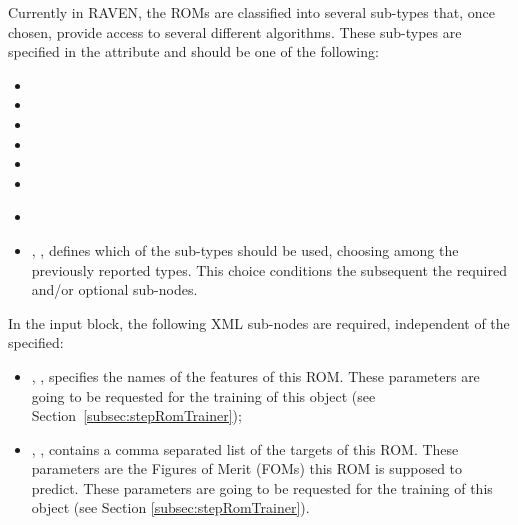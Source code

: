 Currently in RAVEN, the ROMs are classified into several sub-types that, once chosen,
provide access to several different algorithms.
%
These sub-types are specified in the  attribute and should be
one of the following:
\begin{itemize}
  \item {}
  \item {}
  \item {}
  \item {}
  \item {}
  \item {}
\end{itemize}

%
\attrsIntro
%
\vspace{-5mm}
\begin{itemize}
  \itemsep0em
  \item \nameDescription
  \item {}, , defines which of
  the sub-types should be used, choosing among the previously reported
  types.
  This choice conditions the subsequent the required and/or optional
   sub-nodes.
\end{itemize}
\vspace{-5mm}

In the  input block, the following XML sub-nodes are required,
independent of the  specified:
%
\begin{itemize}
   \item {}, , specifies the names of the features of this ROM.
   \nb These parameters are going to be requested for the training of this object (see Section~\ref{subsec:stepRomTrainer});
    \item {}, , contains a comma separated list of the targets of this ROM. These parameters are the Figures of Merit (FOMs) this ROM is supposed to predict.
    \nb These parameters are going to be requested for the training of this
    object (see Section \ref{subsec:stepRomTrainer}).

\end{itemize}

